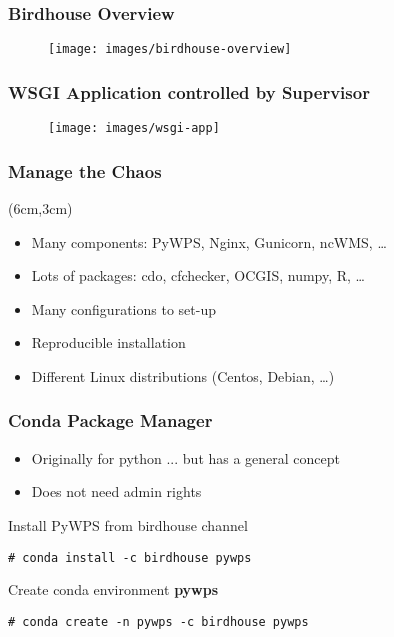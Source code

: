 \documentclass{beamer}
\begin{document}
\begin{frame}
\frametitle<presentation>{Birdhouse Overview}

  \begin{figure}[ht]
    \centering
    \texttt{[image: images/birdhouse-overview]}
  \end{figure}

\end{frame}

\begin{frame}
\frametitle<presentation>{WSGI Application controlled by Supervisor}

  \begin{figure}[ht]
    \centering
    \texttt{[image: images/wsgi-app]}
  \end{figure}

\end{frame}

\begin{frame}
  \frametitle<presentation>{Manage the Chaos}


  \begin{textblock*}{7cm}(6cm,3cm)
  \begin{itemize}
    \item Many components: PyWPS, Nginx, Gunicorn, ncWMS, \ldots
    \item Lots of packages: cdo, cfchecker, OCGIS, numpy, R, \ldots
    \item Many configurations to set-up
    \item Reproducible installation
    \item Different Linux distributions (Centos, Debian, \ldots)
  \end{itemize}
  \end{textblock*}
\end{frame}

\begin{frame}[fragile]
  \frametitle<presentation>{Conda Package Manager}
  \begin{itemize}
    \item Originally for python ... but has a general concept
    \item Does not need admin rights
  \end{itemize}
  Install PyWPS from birdhouse channel
    \begin{verbatim}
# conda install -c birdhouse pywps
    \end{verbatim}
  Create conda environment \textbf{pywps}
    \begin{verbatim}
# conda create -n pywps -c birdhouse pywps
    \end{verbatim}
\end{frame}
\end{document}
